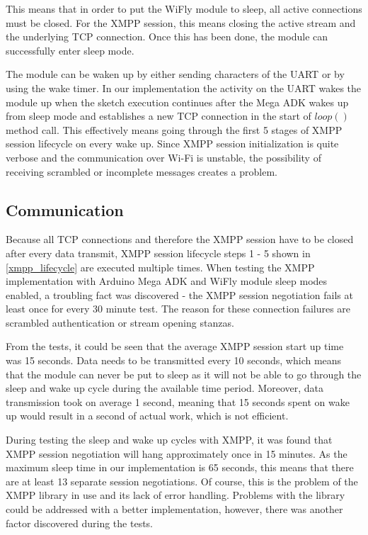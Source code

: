 This means that in order to put the WiFly module to sleep, all active connections must be closed. For the XMPP session, this means closing the active stream and the underlying TCP connection. Once this has been done, the module can successfully enter sleep mode. 

The module can be waken up by either sending characters of the UART or by using the wake timer. In our implementation the activity on the UART wakes the module up when the sketch execution continues after the Mega ADK wakes up from sleep mode and establishes a new TCP connection in the start of $loop()$ method call. This effectively means going through the first 5 stages of XMPP session lifecycle on every wake up. 
Since XMPP session initialization is quite verbose and the communication over Wi-Fi is unstable, the possibility of receiving scrambled or incomplete messages creates a problem. 

\subsection{Communication}

Because all TCP connections and therefore the XMPP session have to be closed after every data transmit, XMPP session lifecycle steps 1 - 5 shown in \autoref{xmpp_lifecycle} are executed multiple times. When testing the XMPP implementation with Arduino Mega ADK and WiFly module sleep modes enabled, a troubling fact was discovered - the XMPP session negotiation fails at least once for every 30 minute test. The reason for these connection failures are scrambled authentication or stream opening stanzas. 

From the tests, it could be seen that the average XMPP session start up time was 15 seconds.  Data needs to be transmitted every 10 seconds, which means that the module can never be put to sleep as it will not be able to go through the sleep and wake up cycle during the available time period. Moreover, data transmission took on average 1 second, meaning that 15 seconds spent on wake up would result in a second of actual work, which is not efficient. 

During testing the sleep and wake up cycles with XMPP, it was found that XMPP session negotiation will hang approximately once in 15 minutes. As the maximum sleep time in our implementation is 65 seconds, this means that there are at least 13 separate session negotiations. Of course, this is the problem of the XMPP library in use and its lack of error handling. Problems with the library could be addressed with a better implementation, however, there was another factor discovered during the tests.

